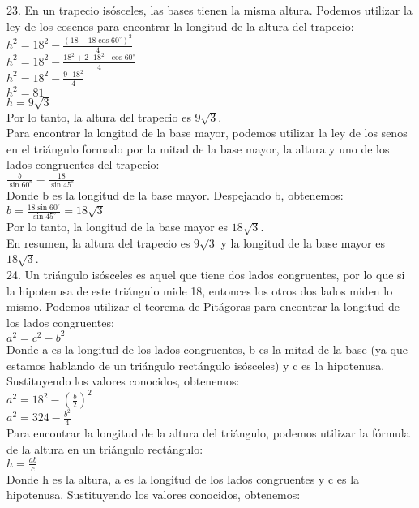 \documentclass{article}
\begin{document}
{\Large 23.}
En un trapecio isósceles, las bases tienen la misma altura. Podemos utilizar la ley de los cosenos para encontrar la longitud de la altura del trapecio:\\
$h^2 = 18^2 - \frac{(18+18\cos{60^\circ})^2}{4}$\\
$h^2 = 18^2 - \frac{18^2+2\cdot18^2\cdot\cos{60^\circ}}{4}$\\
$h^2 = 18^2 - \frac{9\cdot18^2}{4}$\\
$h^2 = 81$\\
$h = 9\sqrt{3}$\\
Por lo tanto, la altura del trapecio es $9\sqrt{3}$.\\
Para encontrar la longitud de la base mayor, podemos utilizar la ley de los senos en el triángulo formado por la mitad de la base mayor, la altura y uno de los lados congruentes del trapecio:\\
$\frac{b}{\sin{60^\circ}} = \frac{18}{\sin{45^\circ}}$\\
Donde b es la longitud de la base mayor. Despejando b, obtenemos:\\
$b = \frac{18\sin{60^\circ}}{\sin{45^\circ}} = 18\sqrt{3}$\\
Por lo tanto, la longitud de la base mayor es $18\sqrt{3}$.\\
En resumen, la altura del trapecio es $9\sqrt{3}$ y la longitud de la base mayor es $18\sqrt{3}$.\\
{\Large 24.}
Un triángulo isósceles es aquel que tiene dos lados congruentes, por lo que si la hipotenusa de este triángulo mide 18, entonces los otros dos lados miden lo mismo. Podemos utilizar el teorema de Pitágoras para encontrar la longitud de los lados congruentes:\\
$a^2 = c^2 - b^2$\\
Donde a es la longitud de los lados congruentes, b es la mitad de la base (ya que estamos hablando de un triángulo rectángulo isósceles) y c es la hipotenusa. Sustituyendo los valores conocidos, obtenemos:\\
$a^2 = 18^2 - \left(\frac{b}{2}\right)^2$\\
$a^2 = 324 - \frac{b^2}{4}$\\
Para encontrar la longitud de la altura del triángulo, podemos utilizar la fórmula de la altura en un triángulo rectángulo:\\
$h = \frac{ab}{c}$\\
Donde h es la altura, a es la longitud de los lados congruentes y c es la hipotenusa. Sustituyendo los valores conocidos, obtenemos:\\
\end{document}
